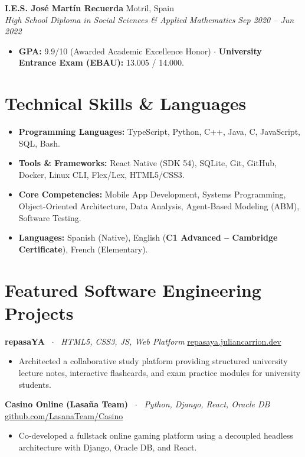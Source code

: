 \documentclass[10pt,a4paper]{article}
\begin{document}
\vspace{2pt}

\textbf{I.E.S. José Martín Recuerda} \hfill Motril, Spain \\
\textit{High School Diploma in Social Sciences \& Applied Mathematics} \hfill \textit{Sep 2020 -- Jun 2022}
\begin{itemize}
    \item \textbf{GPA:} 9.9/10 (Awarded Academic Excellence Honor) $\cdot$ \textbf{University Entrance Exam (EBAU):} 13.005 / 14.000.
\end{itemize}

\section{Technical Skills \& Languages}
\begin{itemize}
    \item \textbf{Programming Languages:} TypeScript, Python, C++, Java, C, JavaScript, SQL, Bash.
    \item \textbf{Tools \& Frameworks:} React Native (SDK 54), SQLite, Git, GitHub, Docker, Linux CLI, Flex/Lex, HTML5/CSS3.
    \item \textbf{Core Competencies:} Mobile App Development, Systems Programming, Object-Oriented Architecture, Data Analysis, Agent-Based Modeling (ABM), Software Testing.
    \item \textbf{Languages:} Spanish (Native), English (\textbf{C1 Advanced -- Cambridge Certificate}), French (Elementary).
\end{itemize}

\section{Featured Software Engineering Projects}

\textbf{repasaYA} \ $\cdot$ \ \textit{HTML5, CSS3, JS, Web Platform} \hfill \href{https://repasaya.juliancarrion.dev}{repasaya.juliancarrion.dev}
\begin{itemize}
    \item Architected a collaborative study platform providing structured university lecture notes, interactive flashcards, and exam practice modules for university students.
\end{itemize}

\vspace{2pt}

\textbf{Casino Online (Lasaña Team)} \ $\cdot$ \ \textit{Python, Django, React, Oracle DB} \hfill \href{https://github.com/LasanaTeam/Casino}{github.com/LasanaTeam/Casino}
\begin{itemize}
    \item Co-developed a fullstack online gaming platform using a decoupled headless architecture with Django, Oracle DB, and React.
\end{itemize}
\end{document}
